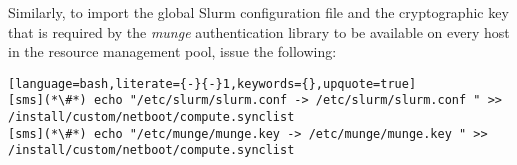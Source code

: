 \noindent Similarly, to import the global Slurm configuration file and the cryptographic
key that is required by the {\em munge} authentication library to be available
on every host in the resource management pool, issue the following:

\begin{lstlisting}[language=bash,literate={-}{-}1,keywords={},upquote=true]
[sms](*\#*) echo "/etc/slurm/slurm.conf -> /etc/slurm/slurm.conf " >> /install/custom/netboot/compute.synclist
[sms](*\#*) echo "/etc/munge/munge.key -> /etc/munge/munge.key " >> /install/custom/netboot/compute.synclist
\end{lstlisting}
